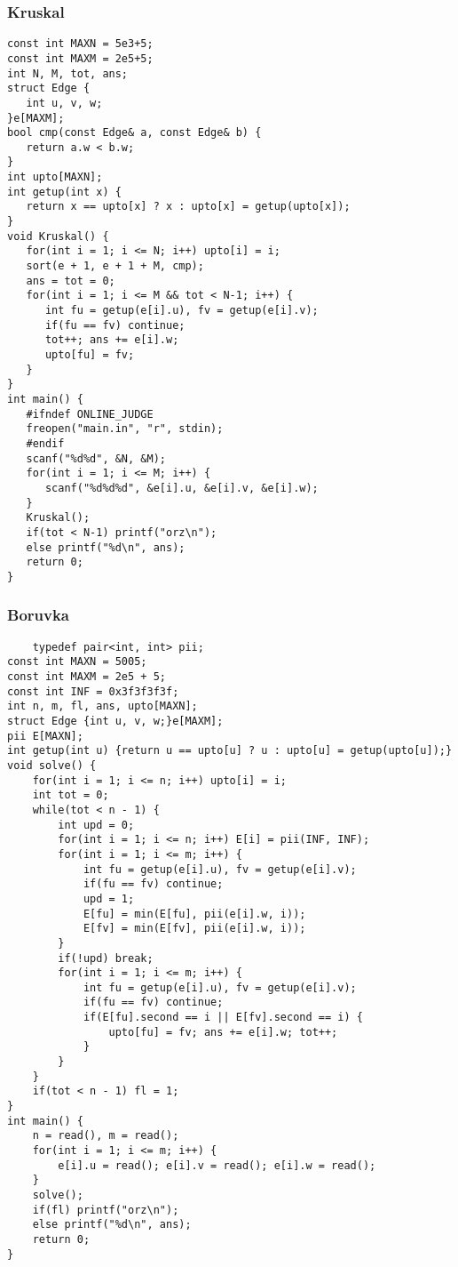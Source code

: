 \documentclass{article}
\begin{document}
    \subsubsection{Kruskal}
\begin{lstlisting}
const int MAXN = 5e3+5;
const int MAXM = 2e5+5;
int N, M, tot, ans;
struct Edge {
   int u, v, w;
}e[MAXM];
bool cmp(const Edge& a, const Edge& b) {
   return a.w < b.w;
}
int upto[MAXN];
int getup(int x) {
   return x == upto[x] ? x : upto[x] = getup(upto[x]);
}
void Kruskal() {
   for(int i = 1; i <= N; i++) upto[i] = i;
   sort(e + 1, e + 1 + M, cmp);
   ans = tot = 0;
   for(int i = 1; i <= M && tot < N-1; i++) {
      int fu = getup(e[i].u), fv = getup(e[i].v);
      if(fu == fv) continue;
      tot++; ans += e[i].w;
      upto[fu] = fv;
   }
}
int main() {
   #ifndef ONLINE_JUDGE
   freopen("main.in", "r", stdin);
   #endif
   scanf("%d%d", &N, &M);
   for(int i = 1; i <= M; i++) {
      scanf("%d%d%d", &e[i].u, &e[i].v, &e[i].w);
   }
   Kruskal();
   if(tot < N-1) printf("orz\n");
   else printf("%d\n", ans);
   return 0;
}
\end{lstlisting}

    \subsubsection{Boruvka}
\begin{lstlisting}
    typedef pair<int, int> pii;
const int MAXN = 5005;
const int MAXM = 2e5 + 5;
const int INF = 0x3f3f3f3f;
int n, m, fl, ans, upto[MAXN];
struct Edge {int u, v, w;}e[MAXM];
pii E[MAXN];
int getup(int u) {return u == upto[u] ? u : upto[u] = getup(upto[u]);}
void solve() {
	for(int i = 1; i <= n; i++) upto[i] = i;
	int tot = 0;
	while(tot < n - 1) {
		int upd = 0;
		for(int i = 1; i <= n; i++) E[i] = pii(INF, INF);
		for(int i = 1; i <= m; i++) {
			int fu = getup(e[i].u), fv = getup(e[i].v);
			if(fu == fv) continue;
			upd = 1;
			E[fu] = min(E[fu], pii(e[i].w, i));
			E[fv] = min(E[fv], pii(e[i].w, i));
		}
		if(!upd) break;
		for(int i = 1; i <= m; i++) {
			int fu = getup(e[i].u), fv = getup(e[i].v);
			if(fu == fv) continue;
			if(E[fu].second == i || E[fv].second == i) {
				upto[fu] = fv; ans += e[i].w; tot++;
			}
		}
	}
	if(tot < n - 1) fl = 1;			
}
int main() {
	n = read(), m = read();
	for(int i = 1; i <= m; i++) {
		e[i].u = read(); e[i].v = read(); e[i].w = read();
	}
	solve();
	if(fl) printf("orz\n");
	else printf("%d\n", ans);
	return 0;
}
\end{lstlisting}
\end{document}
